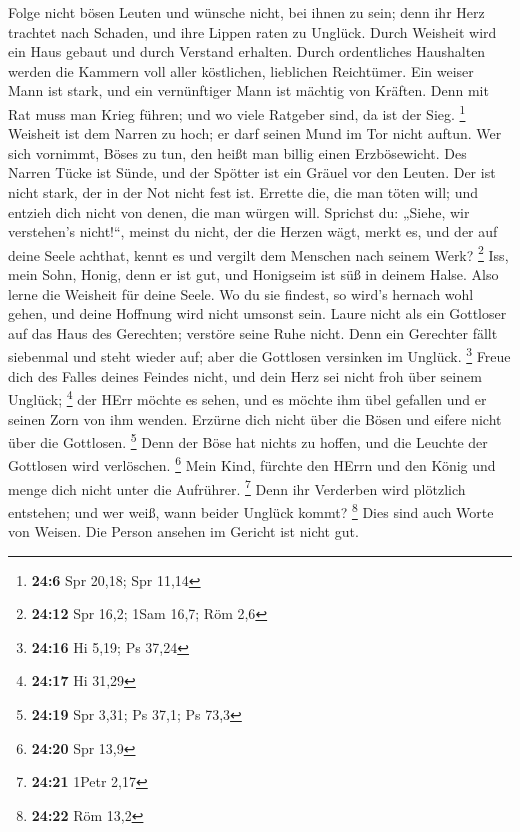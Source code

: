  Folge nicht bösen Leuten und wünsche nicht, bei ihnen zu
sein;  denn ihr Herz trachtet nach Schaden, und ihre Lippen
raten zu Unglück.  Durch Weisheit wird ein Haus gebaut und
durch Verstand erhalten.  Durch ordentliches Haushalten
werden die Kammern voll aller köstlichen, lieblichen Reichtümer.
 Ein weiser Mann ist stark, und ein vernünftiger Mann ist
mächtig von Kräften.  Denn mit Rat muss man Krieg führen;
und wo viele Ratgeber sind, da ist der Sieg. \footnote{\textbf{24:6} Spr
  20,18; Spr 11,14}  Weisheit ist dem Narren zu hoch; er
darf seinen Mund im Tor nicht auftun.  Wer sich vornimmt,
Böses zu tun, den heißt man billig einen Erzbösewicht.  Des
Narren Tücke ist Sünde, und der Spötter ist ein Gräuel vor den Leuten.
 Der ist nicht stark, der in der Not nicht fest ist.
 Errette die, die man töten will; und entzieh dich nicht
von denen, die man würgen will.  Sprichst du: „Siehe, wir
verstehen's nicht!{}``, meinst du nicht, der die Herzen wägt, merkt es,
und der auf deine Seele achthat, kennt es und vergilt dem Menschen nach
seinem Werk? \footnote{\textbf{24:12} Spr 16,2; 1Sam 16,7; Röm 2,6}
 Iss, mein Sohn, Honig, denn er ist gut, und Honigseim ist
süß in deinem Halse.  Also lerne die Weisheit für deine
Seele. Wo du sie findest, so wird's hernach wohl gehen, und deine
Hoffnung wird nicht umsonst sein.  Laure nicht als ein
Gottloser auf das Haus des Gerechten; verstöre seine Ruhe nicht.
 Denn ein Gerechter fällt siebenmal und steht wieder auf;
aber die Gottlosen versinken im Unglück. \footnote{\textbf{24:16} Hi
  5,19; Ps 37,24}  Freue dich des Falles deines Feindes
nicht, und dein Herz sei nicht froh über seinem Unglück; \footnote{\textbf{24:17}
  Hi 31,29}  der HErr möchte es sehen, und es möchte ihm
übel gefallen und er seinen Zorn von ihm wenden.  Erzürne
dich nicht über die Bösen und eifere nicht über die Gottlosen.
\footnote{\textbf{24:19} Spr 3,31; Ps 37,1; Ps 73,3}  Denn
der Böse hat nichts zu hoffen, und die Leuchte der Gottlosen wird
verlöschen. \footnote{\textbf{24:20} Spr 13,9}  Mein Kind,
fürchte den HErrn und den König und menge dich nicht unter die
Aufrührer. \footnote{\textbf{24:21} 1Petr 2,17}  Denn ihr
Verderben wird plötzlich entstehen; und wer weiß, wann beider Unglück
kommt? \footnote{\textbf{24:22} Röm 13,2}  Dies sind auch
Worte von Weisen. Die Person ansehen im Gericht ist nicht gut.
